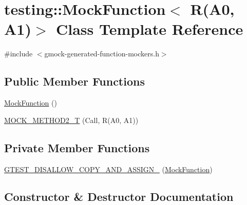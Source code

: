 \hypertarget{classtesting_1_1_mock_function_3_01_r_07_a0_00_01_a1_08_4}{}\section{testing\+::Mock\+Function$<$ R(A0, A1)$>$ Class Template Reference}
\label{classtesting_1_1_mock_function_3_01_r_07_a0_00_01_a1_08_4}


{\ttfamily \#include $<$gmock-\/generated-\/function-\/mockers.\+h$>$}

\subsection*{Public Member Functions}
\begin{DoxyCompactItemize}
\item 
\mbox{\hyperlink{classtesting_1_1_mock_function_3_01_r_07_a0_00_01_a1_08_4_a6a2575d43e9ec4f5d51cd53edbec7f82}{Mock\+Function}} ()
\item 
\mbox{\hyperlink{classtesting_1_1_mock_function_3_01_r_07_a0_00_01_a1_08_4_a5a4d673a3252cab866f0a4fa97486190}{M\+O\+C\+K\+\_\+\+M\+E\+T\+H\+O\+D2\+\_\+T}} (Call, R(A0, A1))
\end{DoxyCompactItemize}
\subsection*{Private Member Functions}
\begin{DoxyCompactItemize}
\item 
\mbox{\hyperlink{classtesting_1_1_mock_function_3_01_r_07_a0_00_01_a1_08_4_a4d66c78f85fd2c438bdf3ccdd61e6edb}{G\+T\+E\+S\+T\+\_\+\+D\+I\+S\+A\+L\+L\+O\+W\+\_\+\+C\+O\+P\+Y\+\_\+\+A\+N\+D\+\_\+\+A\+S\+S\+I\+G\+N\+\_\+}} (\mbox{\hyperlink{classtesting_1_1_mock_function}{Mock\+Function}})
\end{DoxyCompactItemize}


\subsection{Constructor \& Destructor Documentation}
\mbox{\label{classtesting_1_1_mock_function_3_01_r_07_a0_00_01_a1_08_4_a6a2575d43e9ec4f5d51cd53edbec7f82}} 
